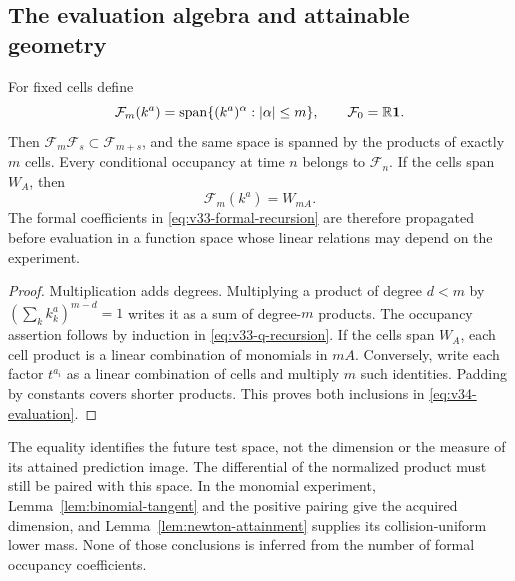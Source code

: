 \subsection{The evaluation algebra and attainable geometry}
\begin{proposition}
\label{prop:v34-evaluation}
For fixed cells define
\[
 \mathcal F_m(k^a)=\operatorname{span}
       \{(k^a)^\alpha:|\alpha|\le m\},\qquad \mathcal F_0=\mathbb R\mathbf 1.
\]
Then $\mathcal F_m\mathcal F_s\subset\mathcal F_{m+s}$, and the
same space is spanned by the products of exactly $m$ cells. Every
conditional occupancy at time $n$ belongs to $\mathcal F_n$.
If the cells span $W_A$, then
\begin{equation}\label{eq:v34-evaluation}
                 \mathcal F_m(k^a)=W_{mA}.
\end{equation}
The formal coefficients in \eqref{eq:v33-formal-recursion} are
therefore propagated before evaluation in a function space whose
linear relations may depend on the experiment.
\end{proposition}
\begin{proof}
Multiplication adds degrees. Multiplying a product of degree $d<m$
by $(\sum_k k_k^a)^{m-d}=1$ writes it as a sum of degree-$m$
products. The occupancy assertion follows by induction in
\eqref{eq:v33-q-recursion}. If the cells span $W_A$, each cell
product is a linear combination of monomials in $mA$. Conversely,
write each factor $t^{a_i}$ as a linear combination of cells and
multiply $m$ such identities. Padding by constants covers shorter
products. This proves both inclusions in \eqref{eq:v34-evaluation}.
\end{proof}

The equality identifies the future test space, not the dimension or
the measure of its attained prediction image. The differential of the
normalized product must still be paired with this space. In the
monomial experiment, Lemma~\ref{lem:binomial-tangent} and the positive
pairing give the acquired dimension, and
Lemma~\ref{lem:newton-attainment} supplies its collision-uniform
lower mass. None of those conclusions is inferred from the number
of formal occupancy coefficients.

